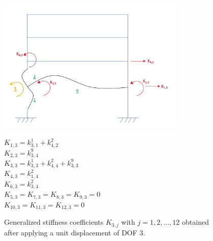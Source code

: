 \documentclass[11pt,a4paper,titlepage]{report}
\begin{document}
\begin{figure} [h]
\begin{minipage}{0.59\linewidth}
        \centering
         \includegraphics[width=9cm]{U=3.jpeg}
\end{minipage}
\begin{minipage}{0.4\linewidth}
\begin{small}
            $K_{1,3} = k^1_{3,1}+k^2_{4,2}$\\
            $K_{2,3} = k^9_{3,4}$\\
            $K_{3,3} = k^1_{3,3}+k^2_{4,4}+k^9_{3,3}$\\
            $K_{4,3} = k^2_{1,4}$\\
            $K_{6,3} = k^2_{3,4}$\\
            $K_{5,3} = K_{7,3} =  K_{8,3} = K_{9,3} = 0$\\
            $K_{10,3} = K_{11,3} = K_{12,3} = 0$\\
\end{small}
\end{minipage}
\caption{Generalized stiffness coefficients $K_{3,j}$ with $j=1,2,...,12$ obtained after applying a unit displacement of DOF 3.}
\label{fig: I.1 - u3=1}
\end{figure}
\end{document}
